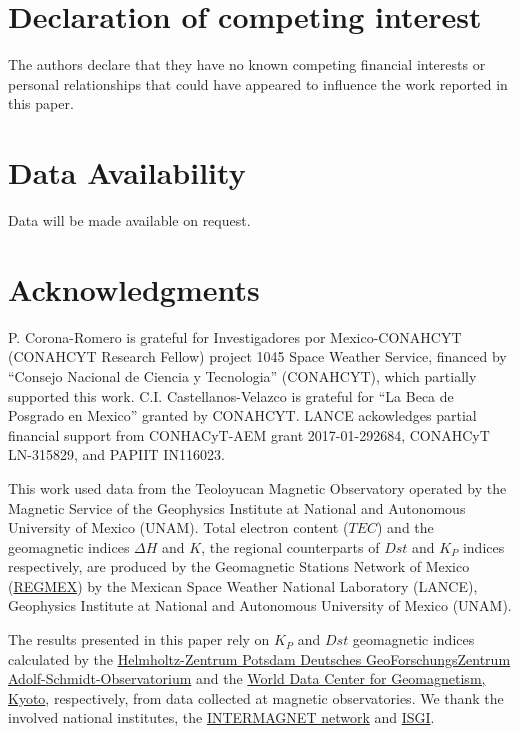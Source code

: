 \documentclass[a4paper,fleqn]{cas-dc}
\begin{document}
\printcredits
\section*{Declaration of competing interest}
\label{Declaration}
The authors declare that they have no known competing financial interests or personal relationships that could have appeared to
influence the work reported in this paper.
\section*{Data Availability}
\label{data_A}
Data will be made available on request.
\section*{Acknowledgments}
P. Corona-Romero is grateful for Investigadores por Mexico-CONAHCYT (CONAHCYT Research Fellow) project 1045 Space Weather Service, financed by “Consejo Nacional de Ciencia y Tecnologia” (CONAHCYT), which partially supported this work. C.I. Castellanos-Velazco is grateful for “La Beca de Posgrado en Mexico” granted by CONAHCYT. LANCE ackowledges partial financial support from CONHACyT-AEM grant 2017-01-292684, CONAHCyT LN-315829, and PAPIIT IN116023.

This work used data from the Teoloyucan Magnetic Observatory operated by the Magnetic Service of the Geophysics Institute at National and Autonomous University of Mexico (UNAM). Total electron content ($TEC$) and the geomagnetic indices $\Delta H$ and $K$, the regional counterparts of $Dst$ and $K_P$ indices respectively, are produced by the Geomagnetic Stations Network of Mexico (\href{http://regmex.unam.mx}{REGMEX}) by the Mexican Space Weather National Laboratory (LANCE), Geophysics Institute at National and Autonomous University of Mexico (UNAM).

The results presented in this paper rely on ${K_{P}}$ and ${Dst}$ geomagnetic indices calculated by the \href{https://www.gfz-potsdam.de/en/kp-index}{Helmholtz-Zentrum Potsdam Deutsches GeoForschungsZentrum Adolf-Schmidt-Observatorium} and the \href{https://wdc.kugi.kyoto-u.ac.jp/}{World Data Center for Geomagnetism, Kyoto}, respectively, from data collected at magnetic observatories. We thank the involved national institutes, the \href{https://intermagnet.github.io/}{INTERMAGNET network} and \href{https://isgi.unistra.fr}{ISGI}.
\end{document}
